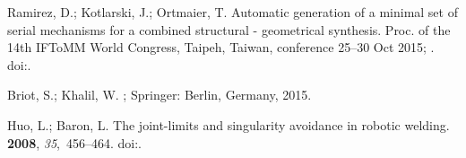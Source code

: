 \documentclass[robotics,article,accept,moreauthors,pdftex]{Definitions/mdpi}
\begin{document}
\begin{thebibliography}{999}
Ramirez, D.; Kotlarski, J.; Ortmaier, T.
\newblock Automatic generation of a minimal set of serial mechanisms for a
  combined structural - geometrical synthesis.
\newblock  Proc. of the 14th IFToMM World Congress, Taipeh, Taiwan, conference 25--30 Oct 2015; .
\newblock
  doi:{\href{https://doi.org/10.6567/IFToMM.14TH.WC.OS13.047}{}}.

Briot, S.; Khalil, W.
; Springer: Berlin, Germany, 2015.

Huo, L.; Baron, L.
\newblock The joint-limits and singularity avoidance in robotic welding.
 {\bf 2008}, {\em
  35},~456--464.
\newblock
  doi:{\href{https://doi.org/10.1108/01439910810893626}{}}.

\end{thebibliography}





\end{document}
